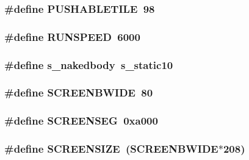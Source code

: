\label{WL__DEF_8H_abbd3a330b0f202948321c73e42cf1395}
\hypertarget{WL__DEF_8H_a5df590fae093cc32e8a2069877374619}{
\subsubsection[{PUSHABLETILE}]{\setlength{\rightskip}{0pt plus 5cm}\#define PUSHABLETILE~98}}
\label{WL__DEF_8H_a5df590fae093cc32e8a2069877374619}
\hypertarget{WL__DEF_8H_a76d14f7b769231535242ac32916ebd5c}{
\subsubsection[{RUNSPEED}]{\setlength{\rightskip}{0pt plus 5cm}\#define RUNSPEED~6000}}
\label{WL__DEF_8H_a76d14f7b769231535242ac32916ebd5c}
\hypertarget{WL__DEF_8H_a4fd03dc10068209ca6434c22c5e543f8}{
\subsubsection[{s\_\-nakedbody}]{\setlength{\rightskip}{0pt plus 5cm}\#define s\_\-nakedbody~s\_\-static10}}
\label{WL__DEF_8H_a4fd03dc10068209ca6434c22c5e543f8}
\hypertarget{WL__DEF_8H_a9d77b150659bac02b1dad2493a26f997}{
\subsubsection[{SCREENBWIDE}]{\setlength{\rightskip}{0pt plus 5cm}\#define SCREENBWIDE~80}}
\label{WL__DEF_8H_a9d77b150659bac02b1dad2493a26f997}
\hypertarget{WL__DEF_8H_ae453594b95ad6a2675c3f583a95a9ef5}{
\subsubsection[{SCREENSEG}]{\setlength{\rightskip}{0pt plus 5cm}\#define SCREENSEG~0xa000}}
\label{WL__DEF_8H_ae453594b95ad6a2675c3f583a95a9ef5}
\hypertarget{WL__DEF_8H_a3dbcadaa63244316dbb17faf17c71640}{
\subsubsection[{SCREENSIZE}]{\setlength{\rightskip}{0pt plus 5cm}\#define SCREENSIZE~(SCREENBWIDE$\ast$208)}}
